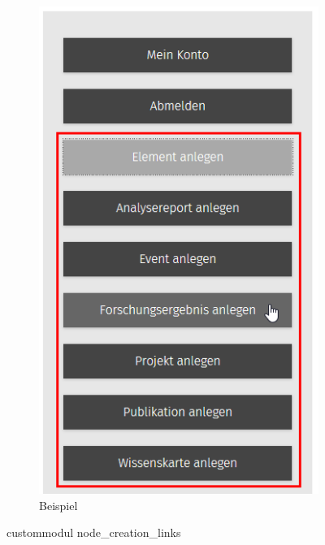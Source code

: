\begin{figure}[H]
\begin{subfigure}[b]{0.4\textwidth}
		\includegraphics[height=0.20\textheight]{images/example_nodecreationlinks}
		\caption[]{Beispiel}
		\label{fig:example_nodecreationlinks}
	\end{subfigure}
	\caption{\gls{custommodul} node\_creation\_links}
	\label{fig:nodecreationlinks}
\end{figure}

